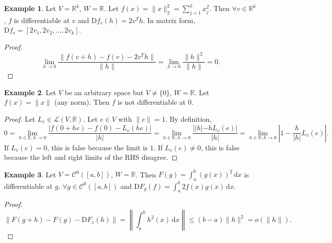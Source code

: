 \documentclass[12pt]{article}
\theoremstyle{plain}
\theoremstyle{definition}
\newtheorem*{eg}{Example}
\begin{document}
\begin{eg}
    Let $V = \mathbb{R}^k$, $W=\mathbb{R}$.
    Let $f(x) = \|x\|_2^2 = \sum_{j=1}^k x_j^2$.
    Then $\forall v\in\mathbb{R}^k$, $f$ is differentiable at $v$ and $\mathrm{D}f_v(h) = 2v^Th$.
    In matrix form, 
    $\mathrm{D}f_v=[2v_1, 2v_2, \ldots, 2v_k]$.
\end{eg}
\begin{proof}
    \[
        \lim_{h\rightarrow 0}\frac{\|f(v+h)-f(v)-2v^Th\|}{\|h\|} = \lim_{h\rightarrow 0}\frac{\|h\|^2}{\|h\|} = 0.
    \]
\end{proof}

\begin{eg}
    Let $V$ be an arbitrary space but $V\neq \{0\}$, $W=\mathbb{R}$.
    Let $f(x) = \|x\|$ (any norm).
    Then $f$ is not differentiable at $0$.
\end{eg}
\begin{proof}
    Let $L_v\in\mathcal{L}(V,\mathbb{R})$.
    Let $e\in V$ with $\|e\|=1$.
    By definition,
    \[
        0=\lim_{h\in\mathbb{R}, h\rightarrow0}\frac{|f(0+he)-f(0)-L_v(he)|}{|h|}
        =\lim_{h\in\mathbb{R}, h\rightarrow0}\frac{| |h|-hL_v(e)|}{|h|}
        =\lim_{h\in\mathbb{R}, h\rightarrow0}\left|1-\frac{h}{|h|}L_v(e)\right|.
    \]
    If $L_v(e)=0$, this is false because the limit is $1$.
    If $L_v(e)\neq 0$, this is false because the left and right limits of the RHS disagree.
\end{proof}

\begin{eg}
    Let $V=\mathcal{C}^0([a,b])$, $W=\mathbb{R}$.
    Then $F(g) = \int_a^b (g(x))^2\,\mathrm{d}x$ is differentiable at $g$, $\forall g\in \mathcal{C}^0([a,b])$ and
    $\mathrm{D}F_g(f)=\int_a^b2f(x)g(x)\,\mathrm{d}x$.
\end{eg}
\begin{proof}
    \[
        \|F(g+h)-F(g)-\mathrm{D}F_v(h)\| = \left\| \int_a^b h^2(x)\,\mathrm{d}x\right\| \leq (b-a) \|h\|^2 = o(\|h\|).
    \]
\end{proof}
\end{document}
